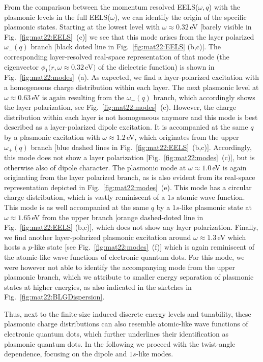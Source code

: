 From the comparison between the momentum resolved EELS($\omega,q$) with the plasmonic levels in the full EELS($\omega$), we can identify the origin of the specific plasmonic states. Starting at the lowest level with $\omega \approx 0.32\,$eV [barely visible in Fig.~\ref{fig:mat22:EELS}~(c)] we see that this mode arises from the layer polarized $\omega_-(q)$ branch [black doted line in Fig.~\ref{fig:mat22:EELS} (b,c)]. The corresponding layer-resolved real-space representation of that mode (the eigenvector $\phi_1(r, \omega\approx 0.32\,$eV$)$ of the dielectric function) is shown in Fig.~\ref{fig:mat22:modes}~(a). As expected, we find a layer-polarized excitation with a homogeneous charge distribution within each layer.  The next plasmonic level at $\omega \approx 0.63\,$eV is again resulting from the $\omega_-(q)$ branch, which accordingly shows the layer polarization, see Fig.~\ref{fig:mat22:modes}~(c). However, the charge distribution within each layer is not homogeneous anymore and this mode is best described as a layer-polarized dipole excitation. It is accompanied at the same $q$ by a plasmonic excitation with $\omega \approx 1.2\,$eV, which originates from the upper $\omega_+(q)$ branch [blue dashed lines in Fig.~\ref{fig:mat22:EELS}~(b,c)]. Accordingly, this mode does not show a layer polarization [Fig.~\ref{fig:mat22:modes}~(c)], but is otherwise also of dipole character. The plasmonic mode at $\omega \approx 1.0\,$eV is again originating from the layer polarized branch, as is also evident from its real-space representation depicted in Fig.~\ref{fig:mat22:modes}~(e). This mode has a circular charge distribution, which is vastly reminiscent of a $1s$ atomic wave function. This mode is as well accompanied at the same $q$ by a $1s$-like plasmonic state at $\omega \approx 1.65\,$eV from the upper branch [orange dashed-doted line in Fig.~\ref{fig:mat22:EELS} (b,c)], which does not show any layer polarization.  Finally, we find another layer-polarized plasmonic excitation around $\omega \approx 1.3\,$eV which hosts a $p$-like state [see Fig.~\ref{fig:mat22:modes}~(f)] which is again reminiscent of the atomic-like wave functions of electronic quantum dots. For this mode, we were however not able to identify the accompanying mode from the upper plasmonic branch, which we attribute to smaller energy separation of plasmonic states at higher energies, as also indicated in the sketches in Fig.~\ref{fig:mat22:BLGDispersion}.

Thus, next to the finite-size induced discrete energy levels and tunability, these plasmonic charge distributions can also resemble atomic-like wave functions of electronic quantum dots, which further underlines their identification as plasmonic quantum dots. In the following we proceed with the twist-angle dependence, focusing on the dipole and $1s$-like modes.

